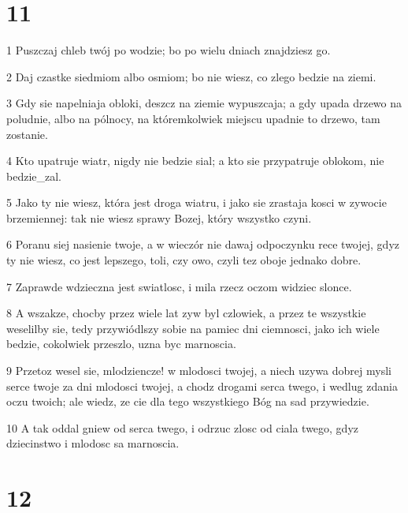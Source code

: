 \chapter{11}

\par 1 Puszczaj chleb twój po wodzie; bo po wielu dniach znajdziesz go.
\par 2 Daj czastke siedmiom albo osmiom; bo nie wiesz, co zlego bedzie na ziemi.
\par 3 Gdy sie napelniaja obloki, deszcz na ziemie wypuszcaja; a gdy upada drzewo na poludnie, albo na pólnocy, na któremkolwiek miejscu upadnie to drzewo, tam zostanie.
\par 4 Kto upatruje wiatr, nigdy nie bedzie sial; a kto sie przypatruje oblokom, nie bedzie_zal.
\par 5 Jako ty nie wiesz, która jest droga wiatru, i jako sie zrastaja kosci w zywocie brzemiennej: tak nie wiesz sprawy Bozej, który wszystko czyni.
\par 6 Poranu siej nasienie twoje, a w wieczór nie dawaj odpoczynku rece twojej, gdyz ty nie wiesz, co jest lepszego, toli, czy owo, czyli tez oboje jednako dobre.
\par 7 Zaprawde wdzieczna jest swiatlosc, i mila rzecz oczom widziec slonce.
\par 8 A wszakze, chocby przez wiele lat zyw byl czlowiek, a przez te wszystkie weselilby sie, tedy przywiódlszy sobie na pamiec dni ciemnosci, jako ich wiele bedzie, cokolwiek przeszlo, uzna byc marnoscia.
\par 9 Przetoz wesel sie, mlodziencze! w mlodosci twojej, a niech uzywa dobrej mysli serce twoje za dni mlodosci twojej, a chodz drogami serca twego, i wedlug zdania oczu twoich; ale wiedz, ze cie dla tego wszystkiego Bóg na sad przywiedzie.
\par 10 A tak oddal gniew od serca twego, i odrzuc zlosc od ciala twego, gdyz dziecinstwo i mlodosc sa marnoscia.

\chapter{12}


